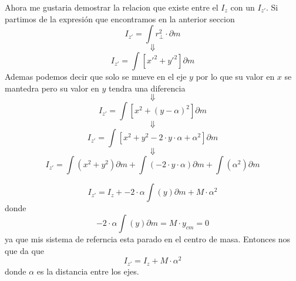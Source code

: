 \documentclass[../Main.tex]{subfiles}
\begin{document}
{    Ahora me gustaria demostrar la relacion que existe entre el $I_z$ con un $I_{z'}$.
    Si partimos de la expresión que encontramos en la anterior seccion
    \begin{equation*}
        I_{z'} = \int r_{\bot}^2 \cdot \partial m
    \end{equation*}
    \begin{equation*}
        \Downarrow
    \end{equation*}
    \begin{equation*}
        I_{z'} = \int \left[ x'^2 + y'^2 \right] \partial m
    \end{equation*}
    Ademas podemos decir que solo se mueve en el eje $y$ por lo que su valor en 
    $x$ se mantedra pero su valor en $y$ tendra una diferencia
    \begin{equation*}
        \Downarrow
    \end{equation*}
    \begin{equation*}
        I_{z'} = \int \left[ x^2 + (y - \alpha )^2 \right] \partial m
    \end{equation*}
    \begin{equation*}
        \Downarrow
    \end{equation*}
    \begin{equation*}
        I_{z'} = \int \left[ x^2 + y^2 - 2 \cdot y \cdot \alpha + \alpha ^2 \right] \partial m
    \end{equation*}
    \begin{equation*}
        \Downarrow
    \end{equation*}
    \begin{equation*}
        I_{z'} = \int \left( x^2 + y^2 \right) \partial m + \int \left( - 2 \cdot y \cdot \alpha \right) \partial m + \int \left( \alpha ^2 \right) \partial m
    \end{equation*}

}
\npage{
}
{
    \begin{equation*}
        I_{z'} = I_{z} + -2 \cdot \alpha \int \left( y \right) \partial m + M \cdot \alpha^2
    \end{equation*}
    donde
    \begin{equation*}
        -2 \cdot \alpha \int \left( y \right) \partial m = M \cdot y_{cm} = 0
    \end{equation*}
    ya que mis sistema de referncia esta parado en el centro de masa. Entonces
    nos que da que
    \begin{equation*}
        I_{z'} = I_{z} + M \cdot \alpha^2
    \end{equation*}
    donde $\alpha$ es la distancia entre los ejes.
}
\end{document}
